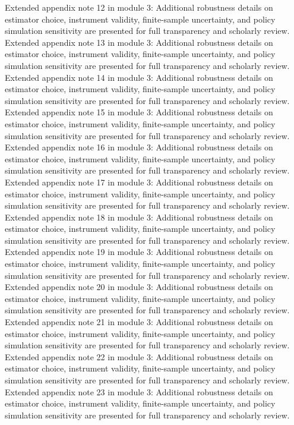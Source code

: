 \documentclass[preprint,12pt]{elsarticle}
\begin{document}
Extended appendix note 12 in module 3: Additional robustness details on estimator choice, instrument validity, finite-sample uncertainty, and policy simulation sensitivity are presented for full transparency and scholarly review.
Extended appendix note 13 in module 3: Additional robustness details on estimator choice, instrument validity, finite-sample uncertainty, and policy simulation sensitivity are presented for full transparency and scholarly review.
Extended appendix note 14 in module 3: Additional robustness details on estimator choice, instrument validity, finite-sample uncertainty, and policy simulation sensitivity are presented for full transparency and scholarly review.
Extended appendix note 15 in module 3: Additional robustness details on estimator choice, instrument validity, finite-sample uncertainty, and policy simulation sensitivity are presented for full transparency and scholarly review.
Extended appendix note 16 in module 3: Additional robustness details on estimator choice, instrument validity, finite-sample uncertainty, and policy simulation sensitivity are presented for full transparency and scholarly review.
Extended appendix note 17 in module 3: Additional robustness details on estimator choice, instrument validity, finite-sample uncertainty, and policy simulation sensitivity are presented for full transparency and scholarly review.
Extended appendix note 18 in module 3: Additional robustness details on estimator choice, instrument validity, finite-sample uncertainty, and policy simulation sensitivity are presented for full transparency and scholarly review.
Extended appendix note 19 in module 3: Additional robustness details on estimator choice, instrument validity, finite-sample uncertainty, and policy simulation sensitivity are presented for full transparency and scholarly review.
Extended appendix note 20 in module 3: Additional robustness details on estimator choice, instrument validity, finite-sample uncertainty, and policy simulation sensitivity are presented for full transparency and scholarly review.
Extended appendix note 21 in module 3: Additional robustness details on estimator choice, instrument validity, finite-sample uncertainty, and policy simulation sensitivity are presented for full transparency and scholarly review.
Extended appendix note 22 in module 3: Additional robustness details on estimator choice, instrument validity, finite-sample uncertainty, and policy simulation sensitivity are presented for full transparency and scholarly review.
Extended appendix note 23 in module 3: Additional robustness details on estimator choice, instrument validity, finite-sample uncertainty, and policy simulation sensitivity are presented for full transparency and scholarly review.
\end{document}
